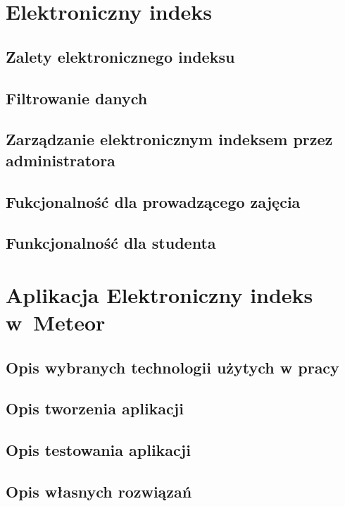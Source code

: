 \documentclass[brudnopis]{xmgr}
\begin{document}
\chapter{Elektroniczny indeks}

\section{Zalety elektronicznego indeksu}

\section{Filtrowanie danych}

\section{Zarządzanie elektronicznym indeksem przez administratora}

\section{Fukcjonalność dla prowadzącego zajęcia}

\section{Funkcjonalność dla studenta}

\chapter{Aplikacja Elektroniczny indeks w~Meteor}

\section{Opis wybranych technologii użytych w pracy}

\section{Opis tworzenia aplikacji}
\cite{Introduction}
\cite{MeteorDocs}
\cite{DiscoverMeteor2013}
\cite{NodeDocs}
\cite{MongoDocs}
\cite{ScalingMongoDB2011}
\cite{ScalingWithMongoDB}
\section{Opis testowania aplikacji}
\cite{Laika}
\section{Opis własnych rozwiązań}
\end{document}
